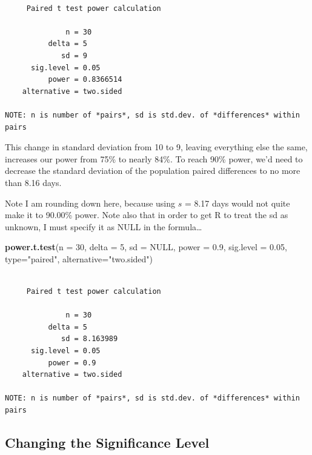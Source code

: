 \documentclass[
]{book}
\newenvironment{Shaded}{\begin{snugshade}}{\end{snugshade}}
\newcommand{\DataTypeTok}[1]{\textcolor[rgb]{0.13,0.29,0.53}{#1}}
\newcommand{\DecValTok}[1]{\textcolor[rgb]{0.00,0.00,0.81}{#1}}
\newcommand{\FloatTok}[1]{\textcolor[rgb]{0.00,0.00,0.81}{#1}}
\newcommand{\KeywordTok}[1]{\textcolor[rgb]{0.13,0.29,0.53}{\textbf{#1}}}
\newcommand{\NormalTok}[1]{#1}
\newcommand{\OtherTok}[1]{\textcolor[rgb]{0.56,0.35,0.01}{#1}}
\newcommand{\StringTok}[1]{\textcolor[rgb]{0.31,0.60,0.02}{#1}}
\begin{document}
\begin{verbatim}

     Paired t test power calculation 

              n = 30
          delta = 5
             sd = 9
      sig.level = 0.05
          power = 0.8366514
    alternative = two.sided

NOTE: n is number of *pairs*, sd is std.dev. of *differences* within pairs
\end{verbatim}

This change in standard deviation from 10 to 9, leaving everything else the same, increases our power from 75\% to nearly 84\%. To reach 90\% power, we'd need to decrease the standard deviation of the population paired differences to no more than 8.16 days.

Note I am rounding down here, because using \(s\) = 8.17 days would not quite make it to 90.00\% power. Note also that in order to get R to treat the sd as unknown, I must specify it as NULL in the formula\ldots{}

\begin{Shaded}
\begin{Highlighting}[]
\KeywordTok{power.t.test}\NormalTok{(}\DataTypeTok{n =} \DecValTok{30}\NormalTok{, }\DataTypeTok{delta =} \DecValTok{5}\NormalTok{, }\DataTypeTok{sd =} \OtherTok{NULL}\NormalTok{, }\DataTypeTok{power =} \FloatTok{0.9}\NormalTok{, }
             \DataTypeTok{sig.level =} \FloatTok{0.05}\NormalTok{, }\DataTypeTok{type=}\StringTok{"paired"}\NormalTok{, }\DataTypeTok{alternative=}\StringTok{"two.sided"}\NormalTok{)}
\end{Highlighting}
\end{Shaded}

\begin{verbatim}

     Paired t test power calculation 

              n = 30
          delta = 5
             sd = 8.163989
      sig.level = 0.05
          power = 0.9
    alternative = two.sided

NOTE: n is number of *pairs*, sd is std.dev. of *differences* within pairs
\end{verbatim}

\hypertarget{changing-the-significance-level}{%
\subsection{Changing the Significance Level}\label{changing-the-significance-level}}
\end{document}
